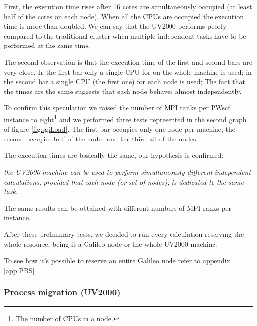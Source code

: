 \documentclass[a4paper,12pt]{article}
\begin{document}
First, the execution time rises after 16 cores are simultaneously occupied (at least half of the cores on each node).
When all the CPUs are occupied the execution time is more than doubled. 
We can say that the UV2000 performs poorly compared to the traditional cluster when multiple independent tasks have to be performed at the same time.

The second observation is that the execution time of the first and second bars are very close. 
In the first bar only a single CPU for on the whole machine is used; in the second bar a single CPU (the first one) for each node is used;
The fact that the times are the same suggests that each node behaves almost independently.

To confirm this speculation we raised the number of MPI ranks per PWscf instance to eight\footnote{The number of CPUs in a node.} and we performed three tests represented  in the second graph of figure \ref{fig:sgiLoad}.
The first bar occupies only one node per machine, the second occupies half of the nodes and the third all of the nodes.

The execution times are basically the same, our hypothesis is confirmed:

\begin{center}
\begin{framed}
\textit{the UV2000 machine can be used to perform simultaneously different independent calculations, provided that each node (or set of nodes), is dedicated to the same task.}
\end{framed}
\end{center}

The same results can be obtained with different numbers of MPI ranks per instance.

\begin{framed}
After these preliminary tests, we decided to run every calculation reserving the whole resource, being it a Galileo node or the whole UV2000 machine.
\end{framed}

To see how it's possible to reserve an entire Galileo node refer to appendix \ref{app:PBS}

\subsubsection{Process migration (UV2000)}
\end{document}
